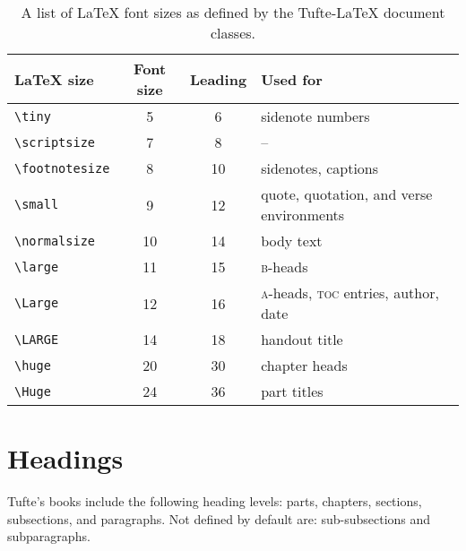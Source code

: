 \documentclass[a4paper,nofonts,notoc,oneside,openany,nobib]{tufte-book}
\newcommand{\TL}{Tufte-\LaTeX\xspace}
\newcommand{\na}{\quad--}%
\begin{document}
\begin{table}[h]
  \footnotesize%
  \begin{center}
    \begin{tabular}{lccl}
      \toprule
      \LaTeX{} size        & Font size & Leading & Used for                                             \\
      \midrule
      \verb+\tiny+         & 5         & 6       & sidenote numbers                                     \\
      \verb+\scriptsize+   & 7         & 8       & \na                                                  \\
      \verb+\footnotesize+ & 8         & 10      & sidenotes, captions                                  \\
      \verb+\small+        & 9         & 12      & quote, quotation, and verse environments             \\
      \verb+\normalsize+   & 10        & 14      & body text                                            \\
      \verb+\large+        & 11        & 15      & \textsc{b}-heads                                     \\
      \verb+\Large+        & 12        & 16      & \textsc{a}-heads, \textsc{toc} entries, author, date \\
      \verb+\LARGE+        & 14        & 18      & handout title                                        \\
      \verb+\huge+         & 20        & 30      & chapter heads                                        \\
      \verb+\Huge+         & 24        & 36      & part titles                                          \\
      \bottomrule
    \end{tabular}
  \end{center}
  \caption{A list of \LaTeX{} font sizes as defined by the \TL document classes.}
  \label{tab:font-sizes}
\end{table}

\section{Headings}\label{sec:headings1}

Tufte's books include the following heading levels: parts,
chapters,  sections, subsections, and paragraphs.  Not defined by default
are: sub-subsections and subparagraphs.
\end{document}
